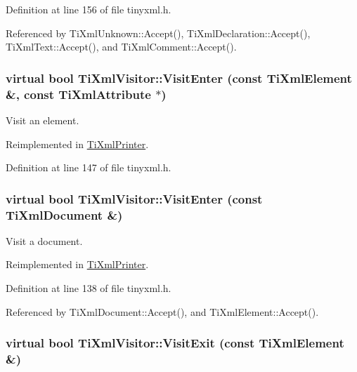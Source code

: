 Definition at line 156 of file tinyxml.h.

Referenced by TiXmlUnknown::Accept(), TiXmlDeclaration::Accept(), TiXmlText::Accept(), and TiXmlComment::Accept().\hypertarget{class_ti_xml_visitor_af6c6178ffa517bbdba95d70490875fff}{
\subsubsection[{VisitEnter}]{\setlength{\rightskip}{0pt plus 5cm}virtual bool TiXmlVisitor::VisitEnter (const {\bf TiXmlElement} \&, \/  const {\bf TiXmlAttribute} $\ast$)}}
\label{class_ti_xml_visitor_af6c6178ffa517bbdba95d70490875fff}


Visit an element. 

Reimplemented in \hyperlink{class_ti_xml_printer_a6dccaf5ee4979f13877690afe28721e8}{TiXmlPrinter}.

Definition at line 147 of file tinyxml.h.\hypertarget{class_ti_xml_visitor_a07baecb52dd7d8716ae2a48ad0956ee0}{
\subsubsection[{VisitEnter}]{\setlength{\rightskip}{0pt plus 5cm}virtual bool TiXmlVisitor::VisitEnter (const {\bf TiXmlDocument} \&)}}
\label{class_ti_xml_visitor_a07baecb52dd7d8716ae2a48ad0956ee0}


Visit a document. 

Reimplemented in \hyperlink{class_ti_xml_printer_a2ec73087db26ff4d2c4316c56f861db7}{TiXmlPrinter}.

Definition at line 138 of file tinyxml.h.

Referenced by TiXmlDocument::Accept(), and TiXmlElement::Accept().\hypertarget{class_ti_xml_visitor_aec2b1f8116226d52f3a1b95dafd3a32c}{
\subsubsection[{VisitExit}]{\setlength{\rightskip}{0pt plus 5cm}virtual bool TiXmlVisitor::VisitExit (const {\bf TiXmlElement} \&)}}
\label{class_ti_xml_visitor_aec2b1f8116226d52f3a1b95dafd3a32c}


